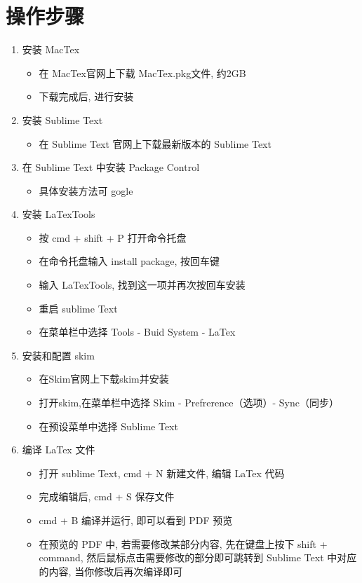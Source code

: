 \documentclass[12pt]{article}
\begin{document}
\section{操作步骤}
\begin{enumerate}
	\item 安装 MacTex 
		\begin{itemize}
			\item 在 MacTex官网上下载 MacTex.pkg文件, 约2GB
			\item 下载完成后, 进行安装
		\end{itemize}
	\item 安装 Sublime Text
		\begin{itemize}
			\item 在 Sublime Text 官网上下载最新版本的 Sublime Text
		\end{itemize}
	\item 在 Sublime Text 中安装 Package Control
		\begin{itemize}
			\item 具体安装方法可 gogle
		\end{itemize}
	\item 安装 LaTexTools
		\begin{itemize}
			\item 按 cmd + shift + P 打开命令托盘
			\item 在命令托盘输入 install package, 按回车键
			\item 输入 LaTexTools, 找到这一项并再次按回车安装
			\item 重启 sublime Text
			\item 在菜单栏中选择 Tools - Buid System - LaTex
		\end{itemize}
	\item 安装和配置 skim
		\begin{itemize}
			\item 在Skim官网上下载skim并安装
			\item 打开skim,在菜单栏中选择 Skim - Prefrerence（选项）- Sync（同步）
			\item 在预设菜单中选择 Sublime Text
		\end{itemize}
	\item 编译 LaTex 文件
		\begin{itemize}
			\item 打开 sublime Text, cmd + N 新建文件, 编辑 LaTex 代码
			\item 完成编辑后, cmd + S 保存文件
			\item cmd + B 编译并运行, 即可以看到 PDF 预览
			\item 在预览的 PDF 中, 若需要修改某部分内容, 先在键盘上按下 shift + command, 然后鼠标点击需要修改的部分即可跳转到 Sublime Text 中对应
			      的内容, 当你修改后再次编译即可
		\end{itemize}
\end{enumerate}
\end{document}
